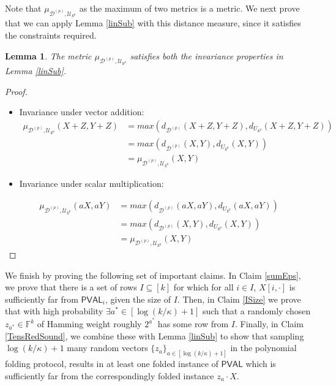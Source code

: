 \documentclass[11pt]{article}
\newtheorem{lemma}[theorem]{Lemma}
\newcommand{\PVAL}{\mathsf{PVAL}}
\newcommand{\F}{\mathbb{F}}
\begin{document}
Note that $\mu_{\mathcal{D}^{(p)},\mathcal{U}_{k^{p}}}$ as the maximum of two metrics is a metric. We next prove that we can apply Lemma \ref{linSub} with this distance measure, since it satisfies the constraints required.
\begin{lemma}
The metric $\mu_{\mathcal{D}^{(p)},\mathcal{U}_{k^{p}}}$ satisfies both the invariance properties in Lemma \ref{linSub}.
\end{lemma}

\begin{proof}
\begin{itemize}
    \item Invariance under vector addition:
\[
\begin{split}
    \mu_{\mathcal{D}^{(p)},\mathcal{U}_{k^{p}}}(X+Z,Y+Z)&=max(d_{\mathcal{D}^{(p)}}(X+Z,Y+Z),d_{U_{k^{p}}}(X+Z,Y+Z))\\
    &=max(d_{\mathcal{D}^{(p)}}(X,Y),d_{U_{k^{p}}}(X,Y))\\
    &=\mu_{\mathcal{D}^{(p)},\mathcal{U}_{k^{p}}}(X,Y)
\end{split}
\]
    \item Invariance under scalar multiplication:
\end{itemize}
\[
\begin{split}
    \mu_{\mathcal{D}^{(p)},\mathcal{U}_{k^{p}}}(aX,aY)&=max(d_{\mathcal{D}^{(p)}}(aX,aY),d_{U_{k^{p}}}(aX,aY))\\
    &=max(d_{\mathcal{D}^{(p)}}(X,Y),d_{U_{k^{p}}}(X,Y))\\
    &=\mu_{\mathcal{D}^{(p)},\mathcal{U}_{k^{p}}}(X,Y)
\end{split}
\]
\end{proof}

We finish by proving the following set of important claims. In Claim \ref{sumEps}, we prove that there is a set of rows $I\subseteq [k]$ for which for all $i\in I$, $X[i,\cdot]$ is sufficiently far from $\PVAL_{i}$, given the size of $I$. Then, in Claim \ref{ISize} we prove that with high probability $\exists a^* \in [\log(k/\kappa)+1]$ such that a randomly chosen $z_{a^*} \in \F^k$ of Hamming weight roughly $2^{a^*}$ has some row from $I$. Finally, in Claim \ref{TensRedSound}, we combine these with Lemma \ref{linSub} to show that sampling $\log (k/\kappa) + 1$ many random vectors $\{z_a\}_{a \in [\log (k/\kappa)+1]}$ in the polynomial folding protocol, results in at least one folded instance of $\PVAL$ which is sufficiently far from the correspondingly folded instance $z_a \cdot X$. 
\end{document}
